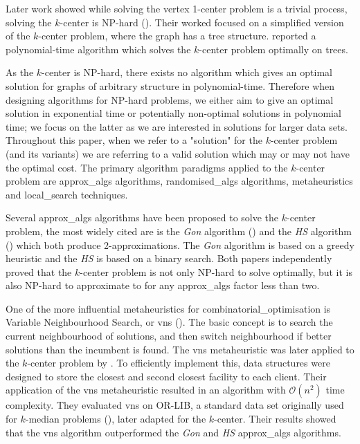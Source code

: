 Later work showed while solving the vertex 1-center problem is a trivial process, solving the $k$-center is NP-hard (\cite{kariv_algorithmic_1979}). Their worked focused on a simplified version of the $k$-center problem, where the graph has a \gls{tree} structure. \textcite{kariv_algorithmic_1979} reported a polynomial-time algorithm which solves the $k$-center problem optimally on trees.

As the $k$-center is NP-hard, there exists no algorithm which gives an optimal solution for graphs of arbitrary structure in polynomial-time. Therefore when designing algorithms for NP-hard problems, we either aim to give an optimal solution in exponential time or potentially non-optimal solutions in polynomial time; we focus on the latter as we are interested in solutions for larger data sets. Throughout this paper, when we refer to a "solution" for the $k$-center problem (and its variants) we are referring to a valid solution which may or may not have the optimal cost. The primary algorithm paradigms applied to the $k$-center problem are \gls{approx_algs} algorithms, \gls{randomised_algs} algorithms, \glspl{metaheuristic} and \gls{local_search} techniques.

Several \gls{approx_algs} algorithms have been proposed to solve the $k$-center problem, the most widely cited are is the \emph{Gon} algorithm (\cite{gonzalez_clustering_1985}) and the \emph{HS} algorithm (\cite{hochbaum_best_1985}) which both produce 2-approximations. The \emph{Gon} algorithm is based on a greedy \gls{heuristic} and the \emph{HS} is based on a binary search. Both papers independently proved that the $k$-center problem is not only NP-hard to solve optimally, but it is also NP-hard to approximate to for any \gls{approx_algs} factor less than two.

One of the more influential \glspl{metaheuristic} for \gls{combinatorial_optimisation} is Variable Neighbourhood Search, or \acrshort{vns} (\cite{mladenovic_variable_1997}). The basic concept is to search the current neighbourhood of solutions, and then switch neighbourhood if better solutions than the incumbent is found. The \acrshort{vns} metaheuristic was later applied to the $k$-center problem by \textcite{mladenovic_solving_2003}. To efficiently implement this, data structures were designed to store the closest and second closest facility to each client. Their application of the \acrshort{vns} metaheuristic resulted in an algorithm with $\mathcal{O}(n^{2})$ time complexity. They evaluated \acrshort{vns} on OR-LIB, a standard data set originally used for $k$-median problems (\cite{beasley_note_1985}), later adapted for the $k$-center. Their results showed that the \acrshort{vns} algorithm outperformed the \emph{Gon} and \emph{HS} \gls{approx_algs} algorithms.

